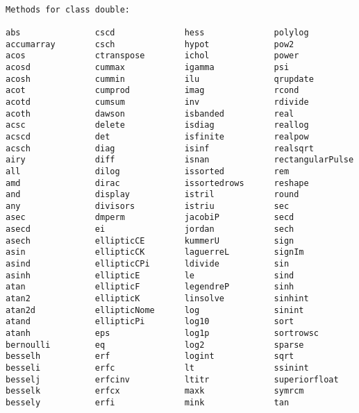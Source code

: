 \documentclass[11pt]{article}
\begin{document}
    \begin{Verbatim}[commandchars=\\\{\}]

Methods for class double:

abs               cscd              hess              polylog           
accumarray        csch              hypot             pow2              
acos              ctranspose        ichol             power             
acosd             cummax            igamma            psi               
acosh             cummin            ilu               qrupdate          
acot              cumprod           imag              rcond             
acotd             cumsum            inv               rdivide           
acoth             dawson            isbanded          real              
acsc              delete            isdiag            reallog           
acscd             det               isfinite          realpow           
acsch             diag              isinf             realsqrt          
airy              diff              isnan             rectangularPulse  
all               dilog             issorted          rem               
amd               dirac             issortedrows      reshape           
and               display           istril            round             
any               divisors          istriu            sec               
asec              dmperm            jacobiP           secd              
asecd             ei                jordan            sech              
asech             ellipticCE        kummerU           sign              
asin              ellipticCK        laguerreL         signIm            
asind             ellipticCPi       ldivide           sin               
asinh             ellipticE         le                sind              
atan              ellipticF         legendreP         sinh              
atan2             ellipticK         linsolve          sinhint           
atan2d            ellipticNome      log               sinint            
atand             ellipticPi        log10             sort              
atanh             eps               log1p             sortrowsc         
bernoulli         eq                log2              sparse            
besselh           erf               logint            sqrt              
besseli           erfc              lt                ssinint           
besselj           erfcinv           ltitr             superiorfloat     
besselk           erfcx             maxk              symrcm            
bessely           erfi              mink              tan               

\end{Verbatim}
\end{document}
